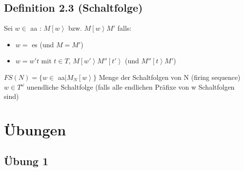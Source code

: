 \documentclass[12pt]{scrreprt}
\begin{document}
\section{Definition 2.3 (Schaltfolge)}
Sei $w \in$ \ac{aa} : $M\left[w\right>$ bzw. $M\left[w\right>M'$ falls:
\begin{itemize}
	\item $w =$ \ac{es} (und $M=M'$)
	\item $w = w't$ mit $t \in T$, $M\left[w'\right>M''\left[t'\right>$ (und $M''\left[t\right>M'$)
\end{itemize}
$FS(N)=\{w \in$ \ac{aa}$ \mid M_N \left[w\right>\}$ Menge der Schaltfolgen von N (firing sequence)\newline
$w \in T^\omega$ unendliche Schaltfolge (falls alle endlichen Präfixe von w Schaltfolgen sind)
\chapter{Übungen}

\section{Übung 1}
\end{document}
